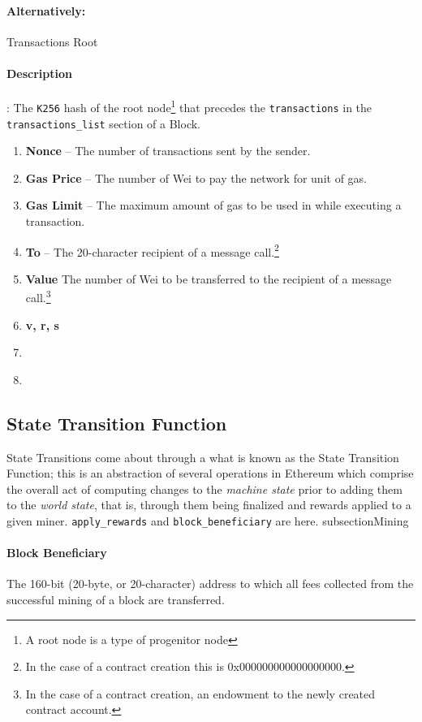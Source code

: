 \documentclass[10pt,a4paper,leqno,bibliography=totoc]{scrartcl}
\newenvironment{alphafootnotes}
{\par\edef\savedfootnotenumber{\number\value{footnote}}
\renewcommand{\thefootnote}{\alph{footnote}}
\setcounter{footnote}{0}}
{\par\setcounter{footnote}{\savedfootnotenumber}}
\begin{document}
\begin{alphafootnotes}
\begin{multicols*}{2}
			\paragraph{Alternatively:} Transactions Root
			\paragraph{Description}: The \texttt{K256} hash of the root node\footnote{A root node is a type of progenitor node} that precedes the \texttt{transactions} in the \texttt{transactions\_list} section of a Block.
			
			
			\begin{enumerate}
				
				\item \textbf{Nonce} -- The number of transactions sent by the sender.
				\item \textbf{Gas Price} -- The number of Wei to pay the network for unit of gas.
				\item \textbf{Gas Limit} -- The maximum amount of gas to be used in while executing a transaction. 
				
				\item \textbf{To} -- The 20-character recipient of a message call.\footnote{In the case of a contract creation this is 0x000000000000000000.}
				\item \textbf{Value} The number of Wei to be transferred to the recipient of a message call.\footnote{In the case of a contract creation, an endowment to the newly created contract account.}
				\item \textbf{v, r, s} 
				\item \textbf{}
				\item 
			\end{enumerate}
			
		\subsection{State Transition Function}
		State Transitions come about through a what is known as the State Transition Function; this is an abstraction of several operations in Ethereum which comprise the overall act of computing changes to the \textit{machine state} prior to adding them to the \textit{world state}, that is, through them being finalized and rewards applied to a given miner. \texttt{apply\_rewards} and \texttt{block\_beneficiary} are here.
		subsection{Mining}
			\paragraph{Block Beneficiary} The 160-bit (20-byte, or 20-character) address to which all fees collected from the successful mining of a block are transferred.

\end{multicols*}
\end{alphafootnotes}
\end{document}
